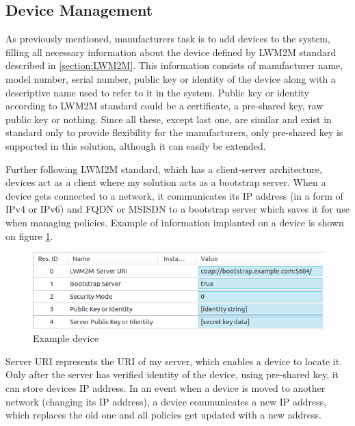 \subsection{Device Management}
\label{deviceManagement}

As previously mentioned, manufacturers task is to add devices to the system, filling all necessary information about the device defined by LWM2M standard described in \ref{section:LWM2M}. This information consists of manufacturer name, model number, serial number, public key or identity of the device along with a descriptive name used to refer to it in the system. Public key or identity according to LWM2M standard could be a certificate, a pre-shared key, raw public key or nothing. Since all these, except last one, are similar and exist in standard only to provide flexibility for the manufacturers, only pre-shared key is supported in this solution, although it can easily be extended. 

Further following LWM2M standard, which has a client-server architecture, devices act as a client where my solution acts as a bootstrap server. When a device gets connected to a network, it communicates its IP address (in a form of IPv4 or IPv6) and FQDN or MSISDN to a bootstrap server which saves it for use when managing policies. Example of information implanted on a device is shown on figure \ref{fig:device}.

\begin{figure}[ht]
	\begin{center}
		\includegraphics[width=\textwidth]{images/Device}
		\caption{Example device}
		\label{fig:device}
	\end{center}
\end{figure}

Server URI represents the URI of my server, which enables a device to locate it. Only after the server has verified identity of the device, using pre-shared key, it can store devices IP address. In an event when a device is moved to another network (changing its IP address), a device communicates a new IP address, which replaces the old one and all policies get updated with a new address.

